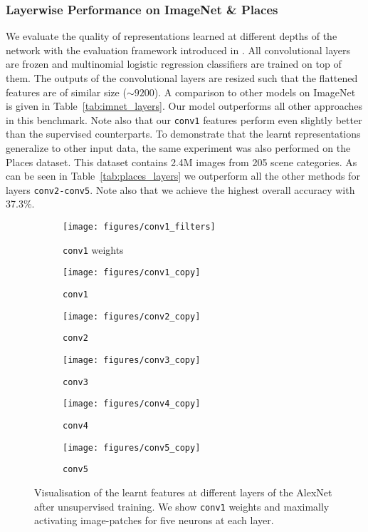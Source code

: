 \documentclass[10pt,twocolumn,letterpaper]{article}
\begin{document}
\subsubsection{Layerwise Performance on ImageNet \& Places}

We evaluate the quality of representations learned at different depths of the network with the evaluation framework introduced in \cite{zhang2016colorful}. All convolutional layers are frozen and multinomial logistic regression classifiers are trained on top of them. The outputs of the convolutional layers are resized such that the flattened features are of similar size ($\sim$$9200$). A comparison to other models on ImageNet is given in Table~\ref{tab:imnet_layers}. Our model outperforms all other approaches in this benchmark. Note also that our \texttt{conv1} features perform even slightly better than the supervised counterparts.
To demonstrate that the learnt representations generalize to other input data, the same experiment was also performed on the Places \cite{NIPS2014_5349} dataset. This dataset contains 2.4M images from 205 scene categories.  As can be seen in Table~\ref{tab:places_layers} we outperform all the other methods for layers \texttt{conv2-conv5}. Note also that we achieve the highest overall accuracy with 37.3\%.

\begin{figure}[t]
\begin{center}
     \begin{subfigure}[b]{0.69\linewidth}
        \texttt{[image: figures/conv1\_filters]}
        \caption{\texttt{conv1} weights}
     \end{subfigure}
     \begin{subfigure}[b]{0.3\linewidth}
        \texttt{[image: figures/conv1\_copy]}
        \caption{\texttt{conv1}}
     \end{subfigure}
     \begin{subfigure}[b]{0.49\linewidth}
        \texttt{[image: figures/conv2\_copy]}
        \caption{\texttt{conv2}}
    \end{subfigure}
    \begin{subfigure}[b]{0.49\linewidth}
        \texttt{[image: figures/conv3\_copy]}
        \caption{\texttt{conv3}}
    \end{subfigure}
    \begin{subfigure}[b]{0.49\linewidth}
        \texttt{[image: figures/conv4\_copy]}
        \caption{\texttt{conv4}}
    \end{subfigure}
    \begin{subfigure}[b]{0.49\linewidth}
        \texttt{[image: figures/conv5\_copy]}
        \caption{\texttt{conv5}}
    \end{subfigure}
\end{center}
   \caption{Visualisation of the learnt features at different layers of the AlexNet after unsupervised training. We show \texttt{conv1} weights and maximally activating image-patches for five neurons at each layer.}
\label{fig:filter_vis}
\end{figure}
\end{document}
